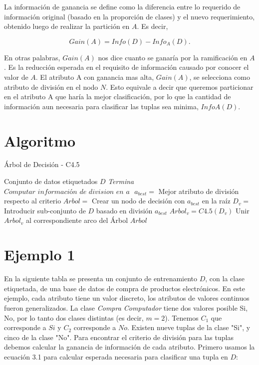 La información de ganancia se define como la diferencia entre lo requerido de información original (basado en la proporción de clases) y el nuevo requerimiento, obtenido luego de realizar la partición en $A$. Es decir,

\begin{equation}
Gain(A) = Info(D) - Info_{A}(D).
\end{equation}

En otras palabras, $Gain(A)$ nos dice cuanto se ganaría por la ramificación en $A$. Es la reducción esperada en el requisito de información causado por conocer el valor de $A$. El atributo A con ganancia mas alta, $Gain(A)$, se selecciona como atributo de división en el nodo $N$. Esto equivale a decir que queremos particionar en el atributo A que haría la mejor clasificación, por lo que la cantidad de información aun necesaria para clasificar las tuplas sea minima, $InfoA(D)$.


\section{Algoritmo}

\begin{algorithm}
	\caption{Árbol de Decisión - C4.5}
	\label{algoC45}
	\begin{algorithmic}[1]
		\Require Conjunto de datos etiquetados $D$
				\State\textit{Termina}
			\EndIf
				\State $\textit{Computar información de division en a }$
			\EndFor
			\State $ a_{best} =$ Mejor atributo de división respecto al criterio 
			\State $ Arbol =$ Crear un nodo de decisión con $ a_{best} $ en la raíz 
			\State $ D_{v} =$ Introducir sub-conjunto de $D$ basado en división $ a_{best} $
				\State $ Arbol_{v} = C4.5(D_{v}) $
				\State Unir $ Arbol_{v} $ al correspondiente arco del Árbol
			\EndFor
			\State 
			\Return $ Arbol $
		\EndProcedure
	\end{algorithmic}
\end{algorithm}

\section{Ejemplo 1}

En la siguiente tabla se presenta un conjunto de entrenamiento $D$, con la clase etiquetada, de una base de datos de compra de productos electrónicos. En este ejemplo, cada atributo tiene un valor discreto, los atributos de valores continuos fueron generalizados. La clase \textit{Compra Computador} tiene dos valores posible {Si, No}, por lo tanto dos clases distintas (es decir, $m=2$). Tenemos $C_1$ que corresponde a $Si$ y $C_2$ corresponde a $No$.
Existen nueve tuplas de la clase "Si", y cinco de la clase "No". Para encontrar el criterio de división para las tuplas debemos calcular la ganancia de información de cada atributo. Primero usamos la ecuación 3.1 para calcular esperada necesaria para clasificar una tupla en $D$:

